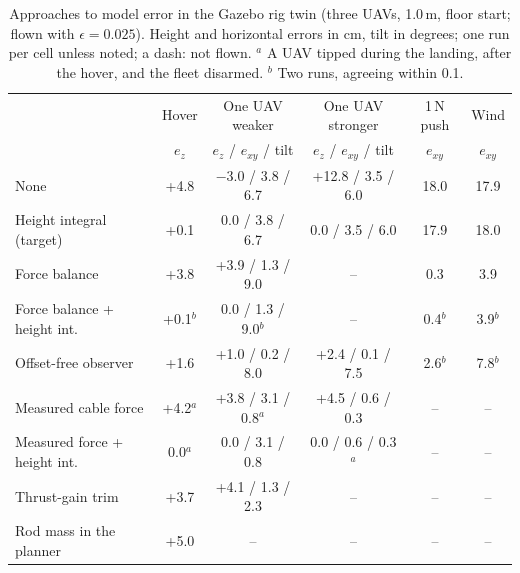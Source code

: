 \begin{table}[h]
\centering
\footnotesize
\setlength{\tabcolsep}{4pt}
\caption{Approaches to model error in the Gazebo rig twin (three UAVs, 1.0\,m, floor start; flown
with $\epsilon = 0.025$). Height and horizontal errors in cm, tilt in degrees; one run per cell
unless noted; a dash: not flown. $^{a}$ A UAV tipped during the landing, after the hover, and the fleet
disarmed. $^{b}$ Two runs, agreeing within 0.1.}
\label{tab:methods}
\begin{tabular}{lccccc}
\toprule
 & Hover & One UAV weaker & One UAV stronger & 1\,N push & Wind \\
 & $e_z$ & $e_z$ / $e_{xy}$ / tilt & $e_z$ / $e_{xy}$ / tilt & $e_{xy}$ & $e_{xy}$ \\
\midrule
None & +4.8 & $-$3.0 / 3.8 / 6.7 & +12.8 / 3.5 / 6.0 & 18.0 & 17.9 \\
Height integral (target) & +0.1 & 0.0 / 3.8 / 6.7 & 0.0 / 3.5 / 6.0 & 17.9 & 18.0 \\
Force balance & +3.8 & +3.9 / 1.3 / 9.0 & -- & 0.3 & 3.9 \\
Force balance + height int. & +0.1$^{b}$ & 0.0 / 1.3 / 9.0$^{b}$ & -- & 0.4$^{b}$ & 3.9$^{b}$ \\
Offset-free observer & +1.6 & +1.0 / 0.2 / 8.0 & +2.4 / 0.1 / 7.5 & 2.6$^{b}$ & 7.8$^{b}$ \\
Measured cable force & +4.2$^{a}$ & +3.8 / 3.1 / 0.8$^{a}$ & +4.5 / 0.6 / 0.3 & -- & -- \\
Measured force + height int. & 0.0$^{a}$ & 0.0 / 3.1 / 0.8 & 0.0 / 0.6 / 0.3$^{a}$ & -- & -- \\
Thrust-gain trim & +3.7 & +4.1 / 1.3 / 2.3 & -- & -- & -- \\
Rod mass in the planner & +5.0 & -- & -- & -- & -- \\
\bottomrule
\end{tabular}
\end{table}

